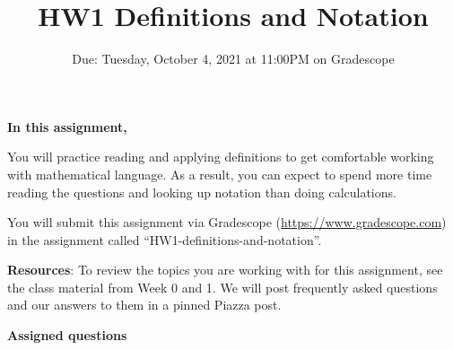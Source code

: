 

\title{HW1 Definitions and Notation}
\date{Due: Tuesday, October 4, 2021 at 11:00PM on Gradescope}


\maketitle
\thispagestyle{fancy}


{\bf In this assignment,}

You will practice reading and
applying definitions to get comfortable working with mathematical language. As
a result, you can expect to spend more time reading the questions and looking
up notation than doing calculations.

\instructions

You will submit this assignment via Gradescope
(\href{https://www.gradescope.com}{https://www.gradescope.com}) 
in the assignment called ``HW1-definitions-and-notation''.


{\bf Resources}: To review the topics you are working with 
for this assignment, see the class material from  Week 0 and 1.
We will post frequently asked questions and our answers to them in a 
pinned Piazza post.

{\bf Assigned questions}

